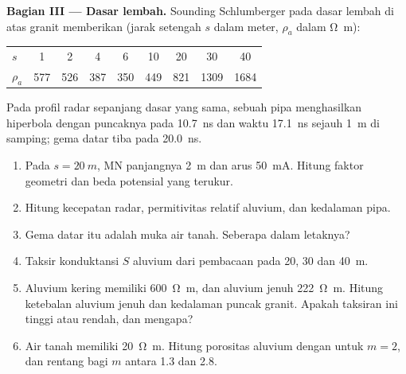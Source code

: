 \begin{problem}
\medskip\noindent\textbf{Bagian III --- Dasar lembah.} Sounding Schlumberger
pada dasar lembah di atas granit memberikan (jarak setengah $s$ dalam
meter, $\rho_a$ dalam \unit{\ohm\metre}):
\begin{center}
\small
\begin{tabular}{lcccccccc}
\hline
$s$ & 1 & 2 & 4 & 6 & 10 & 20 & 30 & 40 \\
$\rho_a$ & 577 & 526 & 387 & 350 & 449 & 821 & 1309 & 1684 \\
\hline
\end{tabular}
\end{center}
Pada profil radar sepanjang dasar yang sama, sebuah pipa menghasilkan hiperbola dengan
puncaknya pada \qty{10.7}{ns} dan waktu \qty{17.1}{ns} sejauh \qty{1}{m}
di samping; gema datar tiba pada \qty{20.0}{ns}.
\begin{enumerate}[resume]
\item Pada $s = \qty{20}{m}$, MN panjangnya \qty{2}{m} dan arus
  \qty{50}{mA}. Hitung faktor geometri dan beda potensial yang terukur.
\item Hitung kecepatan radar, permitivitas relatif
  aluvium, dan kedalaman pipa.
\item Gema datar itu adalah muka air tanah. Seberapa dalam letaknya?
\item Taksir konduktansi $S$ aluvium dari pembacaan pada
  20, 30 dan \qty{40}{m}.
\item Aluvium kering memiliki \qty{600}{\ohm\metre}, dan aluvium jenuh
  \qty{222}{\ohm\metre}. Hitung ketebalan aluvium jenuh
  dan kedalaman puncak granit. Apakah taksiran ini tinggi
  atau rendah, dan mengapa?
\item Air tanah memiliki \qty{20}{\ohm\metre}. Hitung porositas
  aluvium dengan  untuk $m = 2$, dan rentang bagi $m$
  antara \num{1.3} dan \num{2.8}.
\end{enumerate}


\end{problem}
